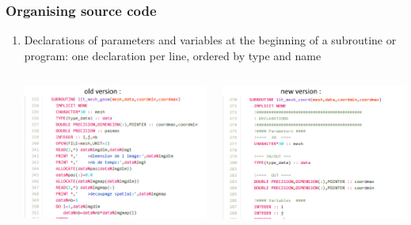 \documentclass[10p]{beamer}
\begin{document}
\begin{frame}
\frametitle{Organising source code}
\begin{enumerate}
\item Declarations of parameters and variables at the beginning of a subroutine or program: one declaration per line, ordered by type and name
\begin{columns}
\begin{column}{150 pt}
\includegraphics[scale=0.60]{Image/before_refactoring_template.png}
\end{column}
\begin{column}{150 pt}
\includegraphics[scale=0.60]{Image/after_refactoring_template.png}
\end{column}
\end{columns}
\end{enumerate}
\end{frame}
\end{document}
